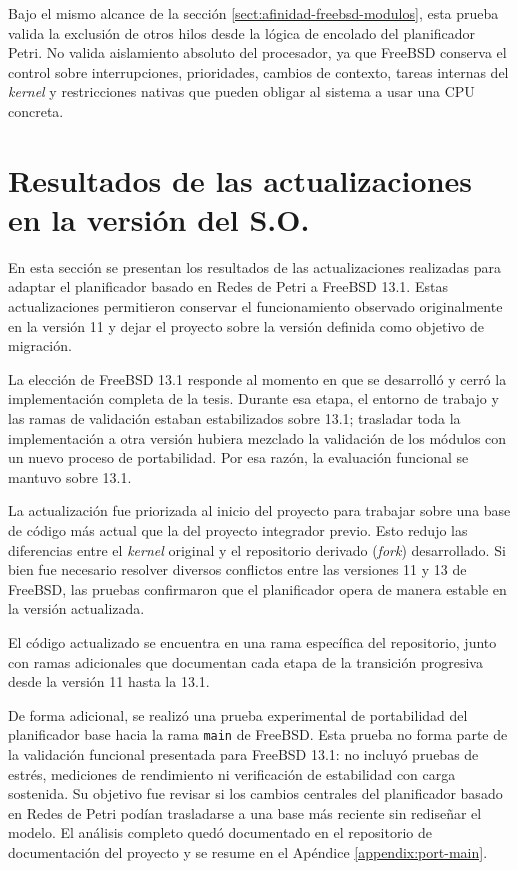 Bajo el mismo alcance de la sección \ref{sect:afinidad-freebsd-modulos}, esta prueba valida la exclusión de otros hilos desde la lógica de encolado del planificador Petri. No valida aislamiento absoluto del procesador, ya que FreeBSD conserva el control sobre interrupciones, prioridades, cambios de contexto, tareas internas del \textit{kernel} y restricciones nativas que pueden obligar al sistema a usar una CPU concreta.\par

\section{Resultados de las actualizaciones en la versión del S.O.}

En esta sección se presentan los resultados de las actualizaciones realizadas para adaptar el planificador basado en Redes de Petri a FreeBSD 13.1. Estas actualizaciones permitieron conservar el funcionamiento observado originalmente en la versión 11 y dejar el proyecto sobre la versión definida como objetivo de migración.\par

La elección de FreeBSD 13.1 responde al momento en que se desarrolló y cerró la implementación completa de la tesis. Durante esa etapa, el entorno de trabajo y las ramas de validación estaban estabilizados sobre 13.1; trasladar toda la implementación a otra versión hubiera mezclado la validación de los módulos con un nuevo proceso de portabilidad. Por esa razón, la evaluación funcional se mantuvo sobre 13.1.\par

La actualización fue priorizada al inicio del proyecto para trabajar sobre una base de código más actual que la del proyecto integrador previo. Esto redujo las diferencias entre el \textit{kernel} original y el repositorio derivado (\textit{fork}) desarrollado. Si bien fue necesario resolver diversos conflictos entre las versiones 11 y 13 de FreeBSD, las pruebas confirmaron que el planificador opera de manera estable en la versión actualizada.\par

El código actualizado se encuentra en una rama específica del repositorio, junto con ramas adicionales que documentan cada etapa de la transición progresiva desde la versión 11 hasta la 13.1.\par

De forma adicional, se realizó una prueba experimental de portabilidad del planificador base hacia la rama \texttt{main} de FreeBSD. Esta prueba no forma parte de la validación funcional presentada para FreeBSD 13.1: no incluyó pruebas de estrés, mediciones de rendimiento ni verificación de estabilidad con carga sostenida. Su objetivo fue revisar si los cambios centrales del planificador basado en Redes de Petri podían trasladarse a una base más reciente sin rediseñar el modelo. El análisis completo quedó documentado en el repositorio de documentación del proyecto y se resume en el Apéndice \ref{appendix:port-main}.\par
